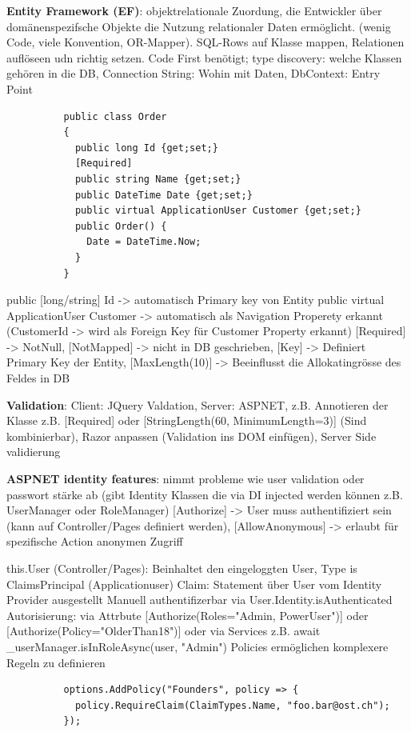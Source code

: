 \documentclass[10pt,landscape]{article}
\begin{document}
\begin{multicols}{2}
        \textbf{Entity Framework (EF)}: objektrelationale Zuordung, die Entwickler über domänenspezifsche Objekte die Nutzung relationaler Daten ermöglicht. (wenig Code, viele Konvention, OR-Mapper). SQL-Rows auf Klasse mappen, Relationen auflöseen udn richtig setzen.
        Code First benötigt; type discovery: welche Klassen gehören in die DB, Connection String: Wohin mit Daten, DbContext: Entry Point
        \begin{lstlisting}
          public class Order
          {
            public long Id {get;set;}
            [Required]
            public string Name {get;set;}
            public DateTime Date {get;set;}
            public virtual ApplicationUser Customer {get;set;}
            public Order() {
              Date = DateTime.Now;
            }
          }
        \end{lstlisting}
        public [long/string] Id -> automatisch Primary key von Entity
        public virtual ApplicationUser Customer -> automatisch als Navigation Properety erkannt (CustomerId -> wird als Foreign Key für Customer Property erkannt)
        [Required] -> NotNull, [NotMapped] -> nicht in DB geschrieben, [Key] -> Definiert Primary Key der Entity, [MaxLength(10)] -> Beeinflusst die Allokatingrösse des Feldes in DB

        \textbf{Validation}: Client: JQuery Valdation, Server: ASPNET, z.B. Annotieren der Klasse z.B. [Required] oder [StringLength(60, MinimumLength=3)] (Sind kombinierbar), Razor anpassen (Validation ins DOM einfügen), Server Side validierung

        \textbf{ASPNET identity features}: nimmt probleme wie user validation oder passwort stärke ab (gibt Identity Klassen die via DI injected werden können z.B. UserManager oder RoleManager)
        [Authorize] -> User muss authentifiziert sein (kann auf Controller/Pages definiert werden), [AllowAnonymous] -> erlaubt für spezifische Action anonymen Zugriff

        this.User (Controller/Pages): Beinhaltet den eingeloggten User, Type is ClaimsPrincipal (Applicationuser)
        Claim: Statement über User vom Identity Provider ausgestellt
        Manuell authentifizerbar via User.Identity.isAuthenticated
        Autorisierung: via Attrbute [Authorize(Roles="Admin, PowerUser")] oder [Authorize(Policy="OlderThan18")] oder via Services z.B. await \_userManager.isInRoleAsync(user, "Admin")
        Policies ermöglichen komplexere Regeln zu definieren
        \begin{lstlisting}
          options.AddPolicy("Founders", policy => {
            policy.RequireClaim(ClaimTypes.Name, "foo.bar@ost.ch");
          });
        \end{lstlisting}


\end{multicols}
\end{document}
